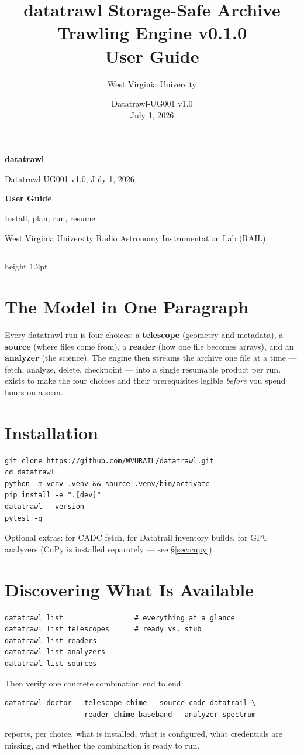 \documentclass[10pt,letterpaper]{article}
\title{datatrawl Storage-Safe Archive Trawling Engine v0.1.0\\User Guide}
\author{West Virginia University}
\date{Datatrawl-UG001 v1.0 \\ July 1, 2026}
\newcommand{\code}[1]{\texttt{\detokenize{#1}}}
\begin{document}
\thispagestyle{fancy}
{\sffamily
\begin{minipage}[t]{0.39\textwidth}
  {\fontsize{24}{26}\selectfont\bfseries\color{TrawlAmber}datatrawl}\par
  {\small Datatrawl-UG001 v1.0, July 1, 2026}
\end{minipage}%
\begin{minipage}[t]{0.61\textwidth}
  \raggedleft
  {\large\bfseries User Guide}\par
  {\small Install, plan, run, resume.}\par
  {\small West Virginia University Radio Astronomy Instrumentation Lab (RAIL)}
\end{minipage}
}
\vspace{6pt}
{\color{TrawlAmber}\hrule height 1.2pt}
\vspace{8pt}

\section{The Model in One Paragraph}
Every datatrawl run is four choices: a \textbf{telescope} (geometry and
metadata), a \textbf{source} (where files come from), a \textbf{reader} (how
one file becomes arrays), and an \textbf{analyzer} (the science). The engine
then streams the archive one file at a time --- fetch, analyze, delete,
checkpoint --- into a single resumable product per run. \code{datatrawl
doctor} exists to make the four choices and their prerequisites legible
\emph{before} you spend hours on a scan.

\section{Installation}
\begin{lstlisting}
git clone https://github.com/WVURAIL/datatrawl.git
cd datatrawl
python -m venv .venv && source .venv/bin/activate
pip install -e ".[dev]"
datatrawl --version
pytest -q
\end{lstlisting}
Optional extras: \code{[cadc]} for CADC fetch, \code{[survey]} for Datatrail
inventory builds, \code{[gpu]} for GPU analyzers (CuPy is installed separately
--- see \S\ref{sec:cupy}).

\section{Discovering What Is Available}
\begin{lstlisting}
datatrawl list                 # everything at a glance
datatrawl list telescopes      # ready vs. stub
datatrawl list readers
datatrawl list analyzers
datatrawl list sources
\end{lstlisting}
Then verify one concrete combination end to end:
\begin{lstlisting}
datatrawl doctor --telescope chime --source cadc-datatrail \
                 --reader chime-baseband --analyzer spectrum
\end{lstlisting}
\code{doctor} reports, per choice, what is installed, what is configured, what
credentials are missing, and whether the combination is ready to run.
\end{document}
